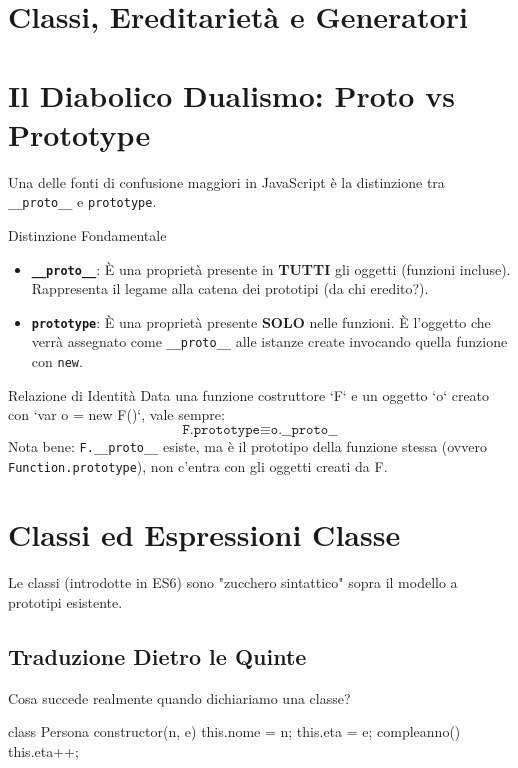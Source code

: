 \section{Classi, Ereditarietà e Generatori}

\section{Il Diabolico Dualismo: Proto vs Prototype}
Una delle fonti di confusione maggiori in JavaScript è la distinzione tra \texttt{\_\_proto\_\_} e \texttt{prototype}.

\begin{definition}{Distinzione Fondamentale}
    \begin{itemize}
        \item \textbf{\texttt{\_\_proto\_\_}}: È una proprietà presente in \textbf{TUTTI} gli oggetti (funzioni incluse). Rappresenta il legame alla catena dei prototipi (da chi eredito?).
        \item \textbf{\texttt{prototype}}: È una proprietà presente \textbf{SOLO} nelle funzioni. È l'oggetto che verrà assegnato come \texttt{\_\_proto\_\_} alle istanze create invocando quella funzione con \texttt{new}.
    \end{itemize}
\end{definition}

\begin{concept}{Relazione di Identità}
Data una funzione costruttore `F` e un oggetto `o` creato con `var o = new F()`, vale sempre:
$$ \texttt{F.prototype} \equiv \texttt{o.\_\_proto\_\_} $$
Nota bene: \texttt{F.\_\_proto\_\_} esiste, ma è il prototipo della funzione stessa (ovvero \texttt{Function.prototype}), non c'entra con gli oggetti creati da F.
\end{concept}

\section{Classi ed Espressioni Classe}
Le classi (introdotte in ES6) sono "zucchero sintattico" sopra il modello a prototipi esistente.

\subsection{Traduzione Dietro le Quinte}
Cosa succede realmente quando dichiariamo una classe?

\begin{jsbox}[title={Classe ES6}]
class Persona {
    constructor(n, e) {
        this.nome = n;
        this.eta = e;
    }
    compleanno() { this.eta++; }
}
\end{jsbox}

